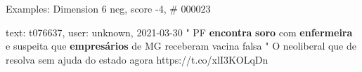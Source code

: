 \begin{frame}{Examples: Dimension 6 neg, score -4, \# 000023}
\footnotesize
\begin{alertblock}{text: t076637, user: unknown, 2021-03-30}
" PF \textbf{encontra} \textbf{soro} com \textbf{enfermeira} e suspeita que 
\textbf{empresários} de MG receberam vacina falsa " O neoliberal que de resolva 
sem ajuda do estado agora  
https://t.co/xlI3KOLqDn 
\end{alertblock}
\end{frame}
